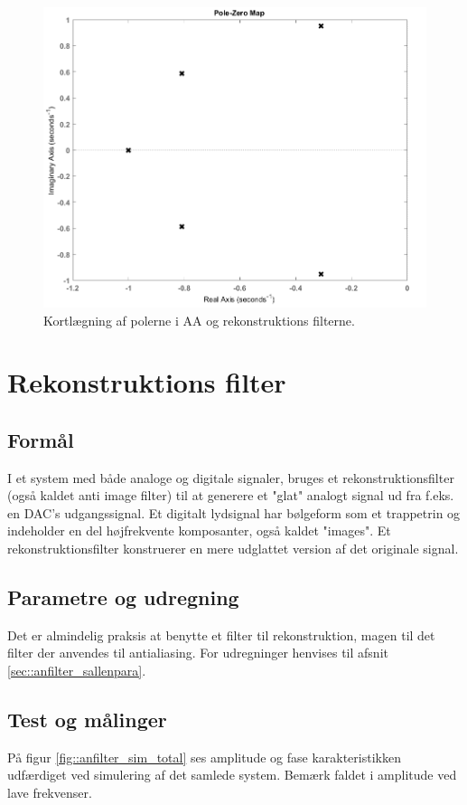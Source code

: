 \begin{figure}[h!]
	\centering
	\includegraphics[scale = 0.35]{./billeder/pzmap}
	\caption{Kortlægning af polerne i AA og rekonstruktions filterne.}
	\label{fig::anfilter_pol}
\end{figure}
\FloatBlock
\section{Rekonstruktions filter}
\subsection{Formål}
I et system med både analoge og digitale signaler, bruges et rekonstruktionsfilter (også kaldet anti image filter) til at generere et "glat"  analogt signal ud fra f.eks. en DAC's udgangssignal. Et digitalt lydsignal har bølgeform som et trappetrin og indeholder en del højfrekvente komposanter, også kaldet "images". Et rekonstruktionsfilter konstruerer en mere udglattet version af det originale signal.
\subsection{Parametre og udregning}
Det er almindelig praksis at benytte et filter til rekonstruktion, magen til det filter der anvendes til antialiasing. For udregninger henvises til afsnit \ref{sec::anfilter_sallenpara}.

\subsection{Test og målinger}
På figur \ref{fig::anfilter_sim_total} ses amplitude og fase karakteristikken udfærdiget ved simulering af det samlede system. Bemærk faldet i amplitude ved lave frekvenser.

